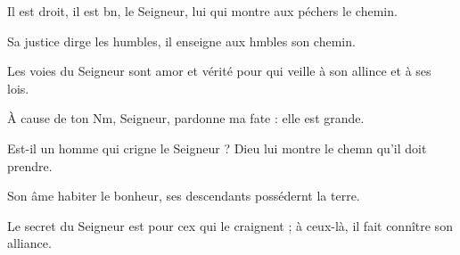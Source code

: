 \item Il est droit, il est bn, le Seigneur,\psstar{} lui qui montre aux péchers le chemin.
\item Sa justice dirge les humbles,\psstar{} il enseigne aux hmbles son chemin.
\item Les voies du Seigneur sont amor et vérité\psstar{} pour qui veille à son allince et à ses lois.
\item À cause de ton Nm, Seigneur,\psstar{} pardonne ma fate : elle est grande.
\item Est-il un homme qui crigne le Seigneur ?\psstar{} Dieu lui montre le chemn qu’il doit prendre.
\item Son âme habiter le bonheur,\psstar{} ses descendants possédernt la terre.
\item Le secret du Seigneur est pour cex qui le craignent ;\psstar{} à ceux-là, il fait connître son alliance.